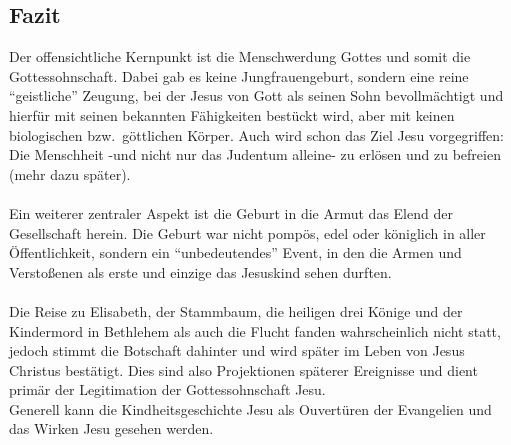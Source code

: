 \subsection{Fazit}
Der offensichtliche Kernpunkt ist die Menschwerdung Gottes und somit die Gottessohnschaft. Dabei gab es keine Jungfrauengeburt, sondern eine reine ``geistliche'' Zeugung, bei der Jesus von Gott als seinen Sohn bevollmächtigt und hierfür mit seinen bekannten Fähigkeiten bestückt wird, aber mit keinen biologischen bzw.\ göttlichen Körper. Auch wird schon das Ziel Jesu vorgegriffen: Die Menschheit -und nicht nur das Judentum alleine- zu erlösen und zu befreien (mehr dazu später).
\\~\\
Ein weiterer zentraler Aspekt ist die Geburt in die Armut das Elend der Gesellschaft herein. Die Geburt war nicht pompös, edel oder königlich in aller Öffentlichkeit, sondern ein ``unbedeutendes'' Event, in den die Armen und Verstoßenen als erste und einzige das Jesuskind sehen durften.
\\~\\
Die Reise zu Elisabeth, der Stammbaum, die heiligen drei Könige und der Kindermord in Bethlehem als auch die Flucht fanden wahrscheinlich nicht statt, jedoch stimmt die Botschaft dahinter und wird später im Leben von Jesus Christus bestätigt. Dies sind also Projektionen späterer Ereignisse und dient primär der Legitimation der Gottessohnschaft Jesu. 
\\ 
Generell kann die Kindheitsgeschichte Jesu als Ouvertüren der Evangelien und das Wirken Jesu gesehen werden.

